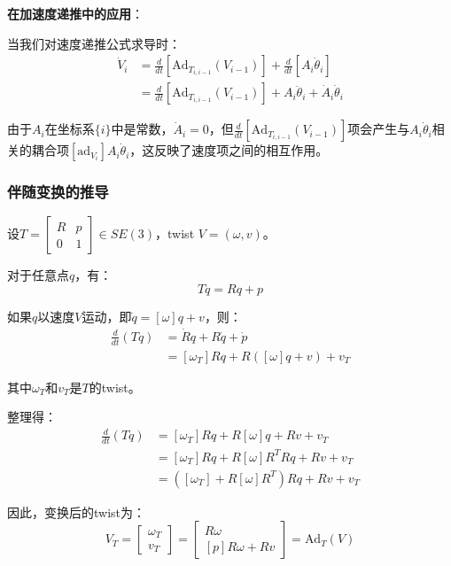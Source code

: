 \documentclass[12pt,a4paper]{article}
\begin{document}
\textbf{在加速度递推中的应用}：

当我们对速度递推公式求导时：
\begin{align}
\dot{V}_i &= \frac{d}{dt}[\text{Ad}_{T_{i,i-1}}(V_{i-1})] + \frac{d}{dt}[A_i \dot{\theta}_i] \\
&= \frac{d}{dt}[\text{Ad}_{T_{i,i-1}}(V_{i-1})] + A_i \ddot{\theta}_i + \dot{A}_i \dot{\theta}_i
\end{align}

由于$A_i$在坐标系$\{i\}$中是常数，$\dot{A}_i = 0$，但$\frac{d}{dt}[\text{Ad}_{T_{i,i-1}}(V_{i-1})]$项会产生与$A_i \dot{\theta}_i$相关的耦合项$[\text{ad}_{V_i}] A_i \dot{\theta}_i$，这反映了速度项之间的相互作用。

\subsubsection{伴随变换的推导}

设$T = \begin{bmatrix} R & p \\ 0 & 1 \end{bmatrix} \in SE(3)$，twist $V = (\omega, v)$。

对于任意点$q$，有：
\begin{equation}
T q = R q + p
\end{equation}

如果$q$以速度$V$运动，即$\dot{q} = [\omega] q + v$，则：
\begin{align}
\frac{d}{dt}(T q) &= \dot{R} q + R \dot{q} + \dot{p} \\
                  &= [\omega_T] R q + R([\omega] q + v) + v_T
\end{align}

其中$\omega_T$和$v_T$是$T$的twist。

整理得：
\begin{align}
\frac{d}{dt}(T q) &= [\omega_T] R q + R[\omega] q + R v + v_T \\
                  &= [\omega_T] R q + R[\omega]R^T R q + R v + v_T \\
                  &= ([\omega_T] + R[\omega]R^T) R q + R v + v_T
\end{align}

因此，变换后的twist为：
\begin{equation}
V_T = \begin{bmatrix}
\omega_T \\
v_T
\end{bmatrix} = \begin{bmatrix}
R \omega \\
[p]R \omega + R v
\end{bmatrix} = \text{Ad}_T(V)
\end{equation}
\end{document}
